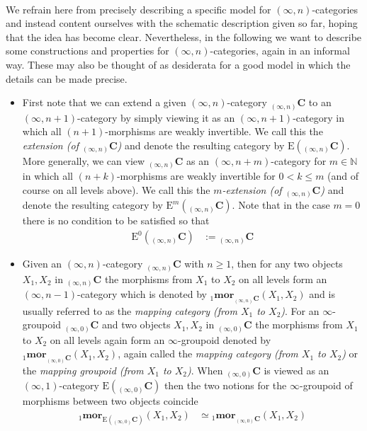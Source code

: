 \\
We refrain here from precisely describing a specific model for $(\infty,n)$-categories and instead content ourselves with the schematic description given so far, hoping that the idea has become clear. Nevertheless, in the following we want to describe some constructions and properties for $(\infty,n)$-categories, again in an informal way. These may also be thought of as desiderata for a good model in which the details can be made precise.
\begin{itemize}
\item
First note that we can extend a given $(\infty,n)$-category ${_{(\infty,n)}}\mathbf{C}$ to an $(\infty,n+1)$-category by simply viewing it as an $(\infty,n+1)$-category in which all $(n+1)$-morphisms are weakly invertible. We call this the \textit{extension (of ${_{(\infty,n)}}\mathbf{C}$)} and denote the resulting category by $\mathrm{E}({_{(\infty,n)}}\mathbf{C})$. More generally, we can view ${_{(\infty,n)}}\mathbf{C}$ as an $(\infty,n+m)$-category for $m \in \mathbb{N}$ in which all $(n+k)$-morphisms are weakly invertible for $0 < k \leq m$ (and of course on all levels above). We call this the \textit{$m$-extension (of ${_{(\infty,n)}}\mathbf{C}$)} and denote the resulting category by $\mathrm{E}^{m}({_{(\infty,n)}}\mathbf{C})$. Note that in the case $m=0$ there is no condition to be satisfied so that
\begin{align*}
  \mathrm{E}^{0}({_{(\infty,n)}}\mathbf{C})
  &:=
  {_{(\infty,n)}}\mathbf{C}
\end{align*}

\item
Given an $(\infty,n)$-category ${_{(\infty,n)}}\mathbf{C}$ with $n \geq 1$, then for any two objects $X_{1},X_{2}$ in ${_{(\infty,n)}}\mathbf{C}$ the morphisms from $X_{1}$ to $X_{2}$ on all levels form an $(\infty,n-1)$-category which is denoted by ${_{1}}\mathbf{mor}_{{_{(\infty,n)}}\mathbf{C}}(X_{1},X_{2})$ and is usually referred to as the \textit{mapping category (from $X_{1}$ to $X_{2}$)}. For an $\infty$-groupoid ${_{(\infty,0)}}\mathbf{C}$ and two objects $X_{1},X_{2}$ in ${_{(\infty,0)}}\mathbf{C}$ the morphisms from $X_{1}$ to $X_{2}$ on all levels again form an $\infty$-groupoid denoted by ${_{1}}\mathbf{mor}_{{_{(\infty,0)}}\mathbf{C}}(X_{1},X_{2})$, again called the \textit{mapping category (from $X_{1}$ to $X_{2}$)} or the \textit{mapping groupoid (from $X_{1}$ to $X_{2}$)}. When ${_{(\infty,0)}}\mathbf{C}$ is viewed as an $(\infty,1)$-category $\mathrm{E}({_{(\infty,0)}}\mathbf{C})$ then the two notions for the $\infty$-groupoid of morphisms between two objects coincide
\begin{align*}
  {_{1}}\mathbf{mor}_{\mathrm{E}({_{(\infty,0)}}\mathbf{C})}(X_{1},X_{2})
  &\simeq
  {_{1}}\mathbf{mor}_{{_{(\infty,0)}}\mathbf{C}}(X_{1},X_{2})
\end{align*}


\end{itemize}
